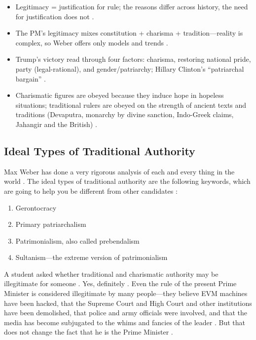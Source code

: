 \begin{QuickRevision}
\begin{itemize}
    \item Legitimacy = justification for rule; the reasons differ across history, the need for justification does not .
    \item The PM's legitimacy mixes constitution + charisma + tradition---reality is complex, so Weber offers only models and trends .
    \item Trump's victory read through four factors: charisma, restoring national pride, party (legal-rational), and gender/patriarchy; Hillary Clinton's ``patriarchal bargain'' .
    \item Charismatic figures are obeyed because they induce hope in hopeless situations; traditional rulers are obeyed on the strength of ancient texts and traditions (Devaputra, monarchy by divine sanction, Indo-Greek claims, Jahangir and the British) .
\end{itemize}
\end{QuickRevision}

\subsection{Ideal Types of Traditional Authority}
Max Weber has done a very rigorous analysis of each and every thing in the world . The ideal types of traditional authority are the following keywords, which are going to help you be different from other candidates :
\begin{enumerate}
    \item Gerontocracy 
    \item Primary patriarchalism 
    \item Patrimonialism, also called prebendalism 
    \item Sultanism---the extreme version of patrimonialism 
\end{enumerate}

\begin{CriticalPoint}
A student asked whether traditional and charismatic authority may be illegitimate for someone . Yes, definitely .
Even the rule of the present Prime Minister is considered illegitimate by many people---they believe EVM machines have been hacked, that the Supreme Court and High Court and other institutions have been demolished, that police and army officials were involved, and that the media has become subjugated to the whims and fancies of the leader .
But that does not change the fact that he is the Prime Minister .
\end{CriticalPoint}

